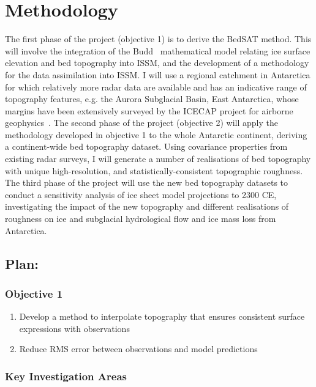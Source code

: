 \chapter{Methodology}

The first phase of the project (objective 1) is to derive the BedSAT method. This will involve the integration of the Budd~\cite{Budd_1970} mathematical model relating ice surface elevation and bed topography into ISSM, and the development of a methodology for the data assimilation into ISSM. I will use a regional catchment in Antarctica for which relatively more radar data are available and has an indicative range of topography features, e.g. the Aurora Subglacial Basin, East Antarctica, whose margins have been extensively surveyed by the ICECAP project for airborne geophysics~\cite{Young_2011}. The second phase of the project (objective 2) will apply the methodology developed in objective 1 to the whole Antarctic continent, deriving a continent-wide bed topography dataset. Using covariance properties from existing radar surveys, I will generate a number of realisations of bed topography with unique high-resolution, and statistically-consistent topographic roughness. The third phase of the project will use the new bed topography datasets to conduct a sensitivity analysis of ice sheet model projections to 2300 CE, investigating the impact of the new topography and different realisations of roughness on ice and subglacial hydrological flow and ice mass loss from Antarctica.\\

\section*{Plan:}
\subsection*{Objective 1}
\begin{enumerate}
\item Develop a method to interpolate topography that ensures consistent surface expressions with observations
\item Reduce RMS error between observations and model predictions
\end{enumerate}

\subsection*{Key Investigation Areas}

